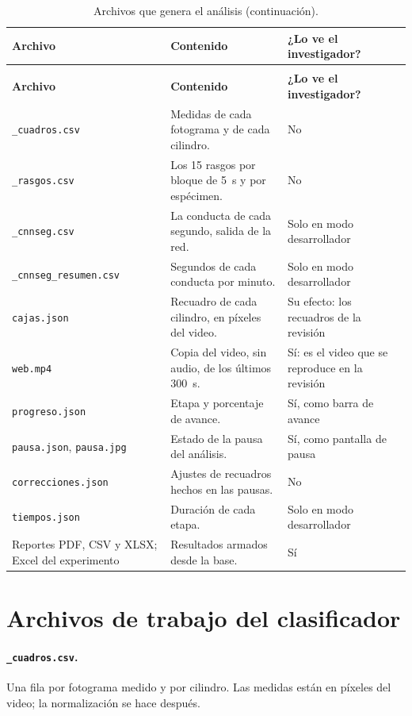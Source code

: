 \begin{longtable}{|p{4.3cm}|p{6.2cm}|p{3.3cm}|}
\caption{Archivos que genera el análisis.}
\label{tab:ap_archivos}\\
\hline
\textbf{Archivo} & \textbf{Contenido} & \textbf{¿Lo ve el investigador?} \\
\hline
\endfirsthead
\caption[]{Archivos que genera el análisis (continuación).}\\
\hline
\textbf{Archivo} & \textbf{Contenido} & \textbf{¿Lo ve el investigador?} \\
\hline
\endhead
\texttt{\_cuadros.csv} & Medidas de cada fotograma y de cada cilindro. & No \\
\hline
\texttt{\_rasgos.csv} & Los 15 rasgos por bloque de 5~s y por espécimen. & No \\
\hline
\texttt{\_cnnseg.csv} & La conducta de cada segundo, salida de la red. & Solo en modo
desarrollador \\
\hline
\texttt{\_cnnseg\_resumen.csv} & Segundos de cada conducta por minuto. & Solo en modo
desarrollador \\
\hline
\texttt{cajas.json} & Recuadro de cada cilindro, en píxeles del video. & Su efecto:
los recuadros de la revisión \\
\hline
\texttt{web.mp4} & Copia del video, sin audio, de los últimos 300~s. & Sí: es el video
que se reproduce en la revisión \\
\hline
\texttt{progreso.json} & Etapa y porcentaje de avance. & Sí, como barra de avance \\
\hline
\texttt{pausa.json}, \texttt{pausa.jpg} & Estado de la pausa del análisis. & Sí, como
pantalla de pausa \\
\hline
\texttt{correcciones.json} & Ajustes de recuadros hechos en las pausas. & No \\
\hline
\texttt{tiempos.json} & Duración de cada etapa. & Solo en modo desarrollador \\
\hline
Reportes PDF, CSV y XLSX; Excel del experimento & Resultados armados desde la
base. & Sí \\
\hline
\end{longtable}

\section{Archivos de trabajo del clasificador}

\paragraph{\texttt{\_cuadros.csv}.} Una fila por fotograma medido y por cilindro. Las
medidas están en píxeles del video; la normalización se hace después.

